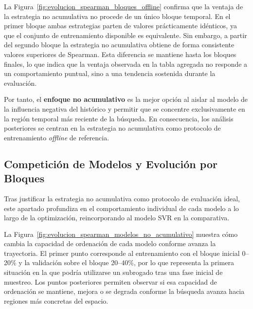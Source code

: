 La Figura~\ref{fig:evolucion_spearman_bloques_offline} confirma que la ventaja de la estrategia no acumulativa no procede de un único bloque temporal. En el primer bloque ambas estrategias parten de valores prácticamente idénticos, ya que el conjunto de entrenamiento disponible es equivalente. Sin embargo, a partir del segundo bloque la estrategia no acumulativa obtiene de forma consistente valores superiores de Spearman. Esta diferencia se mantiene hasta los bloques finales,
lo que indica que la ventaja observada en la tabla agregada no responde a un
comportamiento puntual, sino a una tendencia sostenida durante la evaluación.

Por tanto, el \textbf{enfoque no acumulativo} es la mejor opción al aislar al modelo de la influencia negativa del histórico y permitir que se concentre exclusivamente en la región temporal más reciente de la búsqueda. En consecuencia, los análisis posteriores se centran en la estrategia no acumulativa como protocolo de entrenamiento \textit{offline} de referencia.

\subsection{Competición de Modelos y Evolución por Bloques}
\label{subsec:comparacion_modelos}

Tras justificar la estrategia no acumulativa como protocolo de evaluación ideal, este apartado profundiza en el comportamiento individual de cada modelo a lo largo de la optimización, reincorporando al modelo SVR en la comparativa.


La Figura~\ref{fig:evolucion_spearman_modelos_no_acumulativo} muestra cómo cambia la capacidad de ordenación de cada modelo conforme avanza la trayectoria. El primer punto corresponde al entrenamiento con el bloque inicial 0--20\% y la validación sobre el bloque 20--40\%, por lo que representa la primera situación en la que podría utilizarse un subrogado tras una fase inicial de muestreo. Los puntos posteriores permiten observar si esa capacidad de ordenación se mantiene, mejora o se degrada conforme la búsqueda avanza hacia regiones más concretas del espacio.


